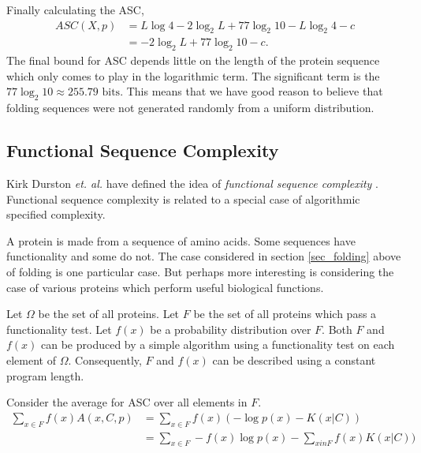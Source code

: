 Finally calculating the ASC,
\begin{align}
    ASC(X,p) &= L \log 4 - 2 \log_2 L + 77 \log_2 10 - L \log_2 4 - c \nonumber \\
    &= - 2 \log_2 L + 77 \log_2 10 - c \mbox{.}
\end{align}
The final bound for ASC depends little on the length of the protein sequence which only comes to play in the logarithmic term.
The significant term is the $77 \log_2 10 \approx 255.79 \mbox{ bits}$.
This means that we have good reason to believe that folding sequences were not generated randomly from a uniform distribution.

\subsection{Functional Sequence Complexity}
Kirk Durston {\it et. al.} have defined the idea of {\it functional sequence complexity} \citep{Durston2007}.
Functional sequence complexity is related to a special case of algorithmic specified complexity.

A protein is made from a sequence of amino acids.
Some sequences have functionality and some do not.
The case considered in section \ref{sec_folding} above of folding is one particular case.
But perhaps more interesting is considering the case of various proteins which perform useful biological functions.

Let $\Omega$ be the set of all proteins.
Let $F$ be the set of all proteins which pass a functionality test.
Let $f(x)$ be a probability distribution over $F$.
Both $F$ and $f(x)$ can be produced by a simple algorithm using a functionality test on each element of $\Omega$.
Consequently, $F$ and $f(x)$ can be described using a constant program length.

Consider the average for ASC over all elements in $F$.
\begin{align}
    \label{ASC.FSC.1}
    \sum_{x \in F} f(x) A(x,C,p) 
    &= \sum_{x \in F} f(x) (-\log p(x) - K(x|C))  \nonumber \\
    &= \sum_{x \in F} -f(x)\log p(x) - \sum_{x in F} f(x) K(x|C))
\end{align}

